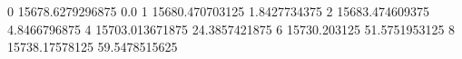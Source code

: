 0 15678.6279296875 0.0
1 15680.470703125 1.8427734375
2 15683.474609375 4.8466796875
4 15703.013671875 24.3857421875
6 15730.203125 51.5751953125
8 15738.17578125 59.5478515625
